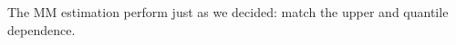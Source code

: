 The MM estimation perform just as we decided: match the upper and quantile dependence.




%
%
%
%
%
%
%
